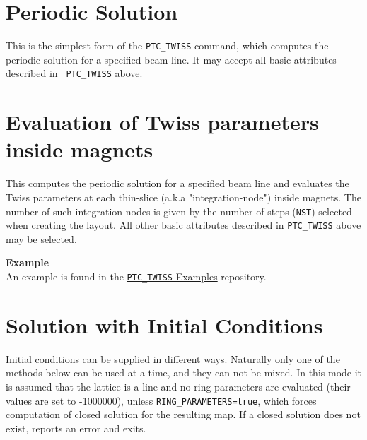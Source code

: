 \section{Periodic Solution}
\label{sec:ptc-twiss-periodic}	

This is the simplest form of the {\tt PTC\_TWISS} command, which
computes the periodic solution for a specified beam line. It may
accept all basic attributes described in \hyperref[sec:ptc-twiss]{\tt
  PTC\_TWISS} above.



\section{Evaluation of Twiss parameters inside magnets}
\label{sec:ptc-twiss-slicing}

This computes the periodic solution for a specified beam
line and evaluates the Twiss parameters at each thin-slice
(a.k.a "integration-node") inside magnets. The number of such
integration-nodes is given by the number of steps ({\tt NST})
selected when creating the \ptc layout. All other basic
attributes described in \hyperref[sec:ptc-twiss]{\tt PTC\_TWISS} above
may be selected.



{\bf Example} \\
An example is found in the
\href{http://madx.web.cern.ch/madx/madX/examples/ptc_twiss/SliceMagnets/}
{{\tt PTC\_TWISS} Examples} repository. 



\section{Solution with Initial Conditions}
\label{sec:ptc-twiss-sol-initial-cond}


Initial conditions can be supplied in different ways.  Naturally only
one of the methods below can be used at a time, and they can not be
mixed.  In this mode it is assumed that the lattice is a line and no
ring parameters are evaluated (their values are set to -1000000), unless
{\tt RING\_PARAMETERS=true}, which forces computation of closed solution
for the resulting map. If a closed solution does not exist, \ptc
reports an error and exits.

